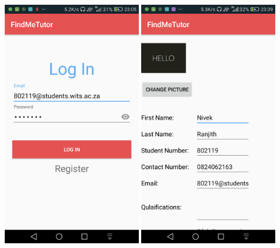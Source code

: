 \documentclass[12pt]{article}
\begin{document}
\begin{flushleft}
\includegraphics[width=60mm]{./Sprint3Models/Screenshots/login.png}
\includegraphics[width=60mm]{./Sprint3Models/Screenshots/profile.png}
\end{flushleft}
\end{document}
